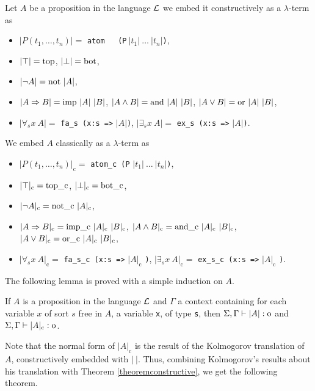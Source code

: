 \documentclass[english]{lipics}
\newcommand\fa{\forall}
\newcommand\ex{\exists}
\newcommand\lst[1]{{\rm \lstinline{#1}}}
\begin{document}
\begin{definition}
Let $A$ be a proposition in the language ${\cal L}$
we embed it constructively as a $\lambda$-term as
\begin{itemize}
\item $|P(t_1,\ldots,t_n)| =$ \lst{atom
  (P}$~|t_1|~\ldots~|t_n|$\lst{)},
\item $|\top| = \mbox{\lst{top}}$, $|\bot| = \mbox{\lst{bot}}$,
\item $|\neg A| = \mbox{\lst{not}}~|A|$,
\item $|A \Rightarrow B| = \mbox{\lst{imp}}~|A|~|B|$,
$|A \wedge B| = \mbox{\lst{and}}~|A|~|B|$,
$|A \vee B| = \mbox{\lst{or}}~|A|~|B|$,
\item
$|\fa_s x~A| = $ \lst{fa_s (x:s =>} $|A|$\lst{)},
$|\ex_s x~A| = $ \lst{ex_s (x:s =>} $|A|$\lst{)}.
\end{itemize}
We embed $A$ classically as a $\lambda$-term as
\begin{itemize}
\item $|P(t_1,\ldots,t_n)|_{\mathrm c} =$ \lst{atom_c (P}
  $|t_1|~\ldots~|t_n|$\lst{)},
\item $|\top|_{\mathrm c} = \mbox{\lst{top_c}}$, $|\bot|_{\mathrm c} = \mbox{\lst{bot_c}}$,
\item $|\neg A|_{\mathrm c} = \mbox{\lst{not_c}}~|A|_{\mathrm c}$,
\item $|A \Rightarrow B|_{\mathrm c} = \mbox{\lst{imp_c}}~|A|_{\mathrm c}~|B|_{\mathrm c}$,
$|A \wedge B|_{\mathrm c} = \mbox{\lst{and_c}}~|A|_{\mathrm c}~|B|_{\mathrm c}$,
$|A \vee B|_{\mathrm c} = \mbox{\lst{or_c}}~|A|_{\mathrm c}~|B|_{\mathrm c}$,
\item
$|\fa_s x~A|_{\mathrm c} = $ \lst{fa_s_c (x:s =>} $|A|_{\mathrm c}$ \lst{)},
$|\ex_s x~A|_{\mathrm c} = $ \lst{ex_s_c (x:s =>} $|A|_{\mathrm c}$ \lst{)}.
\end{itemize}
\end{definition}

The following lemma is proved with a simple induction on $A$.

\begin{lemma}
If $A$ is a proposition in the language ${\cal L}$ and
$\Gamma$ a context containing for each variable $x$ of sort
$s$ free in $A$, a variable \lst{x}, of type \lst{s}, then
$\Sigma, \Gamma \vdash |A|:\mbox{\lst{o}}$
and
$\Sigma, \Gamma \vdash |A|_{\mathrm c}:\mbox{\lst{o}}$.
\end{lemma}

Note that the normal form of $|A|_{\mathrm c}$ is the result of the Kolmogorov
translation of $A$, constructively embedded with $|~|$. Thus,
combining Kolmogorov's results about his translation with Theorem
\ref{theoremconstructive}, we get the following theorem.
\end{document}
